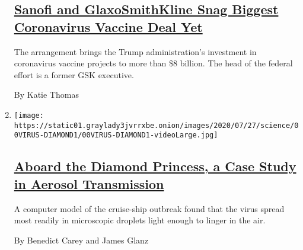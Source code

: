 \begin{enumerate}
{  \subsection{\texorpdfstring{\href{/2020/07/31/health/covid-19-vaccine-sanofi-gsk.html}{Sanofi
  and GlaxoSmithKline Snag Biggest Coronavirus Vaccine Deal
  Yet}}{Sanofi and GlaxoSmithKline Snag Biggest Coronavirus Vaccine Deal Yet}}\label{sanofi-and-glaxosmithkline-snag-biggest-coronavirus-vaccine-deal-yet}}

  The arrangement brings the Trump administration's investment in
  coronavirus vaccine projects to more than \$8 billion. The head of the
  federal effort is a former GSK executive.

  By Katie Thomas
\item
  \texttt{[image: https://static01.graylady3jvrrxbe.onion/images/2020/07/27/science/00VIRUS-DIAMOND1/00VIRUS-DIAMOND1-videoLarge.jpg]}

  \hypertarget{aboard-the-diamond-princess-a-case-study-in-aerosol-transmission}{%
  \subsection{\texorpdfstring{\href{/2020/07/30/health/diamond-princess-coronavirus-aerosol.html}{Aboard
  the Diamond Princess, a Case Study in Aerosol
  Transmission}}{Aboard the Diamond Princess, a Case Study in Aerosol Transmission}}\label{aboard-the-diamond-princess-a-case-study-in-aerosol-transmission}}

  A computer model of the cruise-ship outbreak found that the virus
  spread most readily in microscopic droplets light enough to linger in
  the air.

  By Benedict Carey and James Glanz
\end{enumerate}


